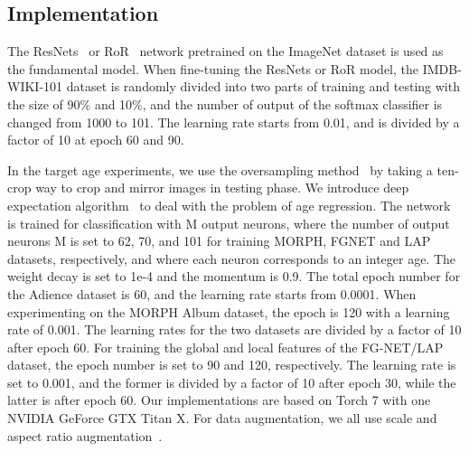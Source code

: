 \documentclass[journal]{IEEEtran}
\begin{document}
\subsection{Implementation}
The ResNets~\cite{ref-58} or RoR~\cite{ref-15} network pretrained on the ImageNet dataset is used as the fundamental model. When fine-tuning the ResNets or RoR model, the IMDB-WIKI-101 dataset is randomly divided into two parts of training and testing with the size of 90\% and 10\%, and the number of output of the softmax classifier is changed from 1000 to 101. The learning rate starts from 0.01, and is divided by a factor of 10 at epoch 60 and 90.
\par
In the target age experiments, we use the oversampling method~\cite{ref-16} by taking a ten-crop way to crop and mirror images in testing phase. We introduce deep expectation algorithm~\cite{ref-19} to deal with the problem of age regression. The network is trained for classification with M output neurons, where the number of output neurons M is set to 62, 70, and 101 for training MORPH, FGNET and LAP datasets, respectively, and where each neuron corresponds to an integer age. The weight decay is set to 1e-4 and the momentum is 0.9. The total epoch number for the Adience dataset is 60, and the learning rate starts from 0.0001. When experimenting on the MORPH Album dataset, the epoch is 120 with a learning rate of 0.001. The learning rates for the two datasets are divided by a factor of 10 after epoch 60. For training the global and local features of the FG-NET/LAP dataset, the epoch number is set to 90 and 120, respectively. The learning rate is set to 0.001, and the former is divided by a factor of 10 after epoch 30, while the latter is after epoch 60. Our implementations are based on Torch 7 with one NVIDIA GeForce GTX Titan X. For data augmentation, we all use scale and aspect ratio augmentation~\cite{ref-58}.
\end{document}
